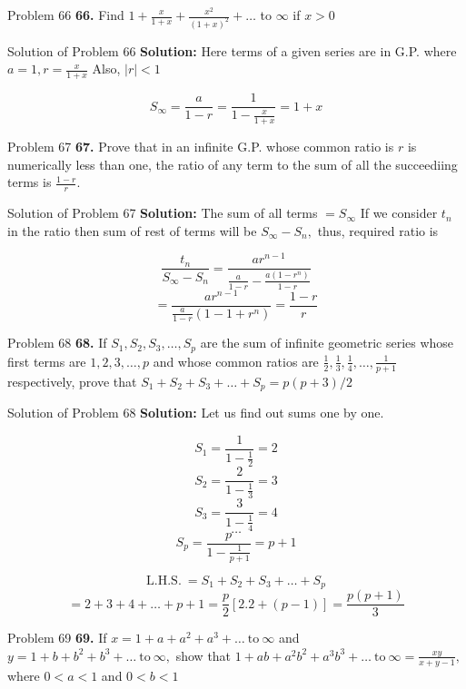 \documentclass[aspectratio=1610,8pt]{beamer}
\begin{document}
\begin{frame}{Problem 66}
  \textbf{66.} Find $1 + \frac{x}{1 + x} + \frac{x^2}{(1 + x)^2} + \ldots$ to $\infty$ if $x > 0$
\end{frame}
\begin{frame}{Solution of Problem 66}
  \textbf{Solution:} Here terms of a given series are in G.P. where $a = 1, r = \frac{x}{1 + x}$ Also, $|r| < 1$

  $$S_\infty = \frac{a}{1 - r} = \frac{1}{1 - \frac{x}{1 + x}} = 1 + x$$
\end{frame}
\begin{frame}{Problem 67}
  \textbf{67.} Prove that in an infinite G.P. whose common ratio is $r$ is numerically less than one, the ratio of any term to the
  sum of all the succeediing terms is $\frac{1 - r}{r}$.
\end{frame}
\begin{frame}{Solution of Problem 67}
  \textbf{Solution:} The sum of all terms $= S_\infty$ If we consider $t_n$ in the ratio then sum of rest of terms will be
  $S_\infty - S_n,$ thus, required ratio is

  $$\frac{t_n}{S_\infty - S_n} = \frac{ar^{n - 1}}{\frac{a}{1 - r} - \frac{a(1 - r^n)}{1 - r}}$$
  $$= \frac{ar^{n - 1}}{\frac{a}{1 - r}(1 - 1 + r^{n})} = \frac{1- r}{r}$$
\end{frame}
\begin{frame}{Problem 68}
  \textbf{68.} If $S_1, S_2, S_3, \ldots, S_p$ are the sum of infinite geometric series whose first terms are $1, 2, 3, \ldots, p$
  and whose common ratios are $\frac{1}{2}, \frac{1}{3}, \frac{1}{4}, \ldots, \frac{1}{p + 1}$ respectively, prove that $S_1 + S_2
  + S_3 + \ldots + S_p = p(p + 3)/2$
\end{frame}
\begin{frame}{Solution of Problem 68}
  \textbf{Solution:} Let us find out sums one by one.

  $$S_1 = \frac{1}{1 - \frac{1}{2}} = 2$$
  $$S_2 = \frac{2}{1 - \frac{1}{3}} = 3$$
  $$S_3 = \frac{3}{1 - \frac{1}{4}} = 4$$
  $$\ldots$$
  $$S_p = \frac{p}{1 - \frac{1}{p + 1}} = p + 1$$

  $$\text{L.H.S.}~= S_1 + S_2 + S_3 + \ldots + S_p$$
  $$= 2 + 3 + 4 + \ldots + p + 1 = \frac{p}{2}[2.2 + (p - 1)] = \frac{p(p + 1)}{3}$$
\end{frame}
\begin{frame}{Problem 69}
  \textbf{69.} If $x = 1 + a + a^2 + a^3 + \ldots~\text{to}~\infty$ and $y = 1 + b + b^2 + b^3 + \ldots~\text{to}~\infty,$ show
  that $1 + ab + a^2b^2 + a^3b^3 + \ldots~\text{to}~\infty = \frac{xy}{x + y - 1},$ where $0<a< 1$ and $0<b<1$
\end{frame}
\end{document}
